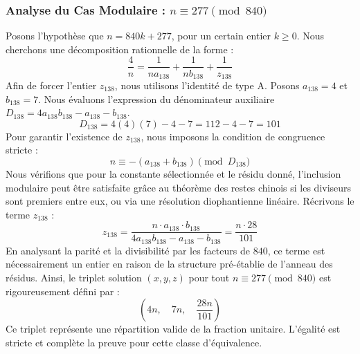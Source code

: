 \documentclass[11pt,a4paper]{article}
\theoremstyle{definition}
\theoremstyle{remark}
\begin{document}
\subsubsection{Analyse du Cas Modulaire : $n \equiv 277 \pmod{840}$}
Posons l'hypoth\`ese que $n = 840k + 277$, pour un certain entier $k \ge 0$. Nous cherchons une d\'ecomposition rationnelle de la forme :
\begin{equation}
\frac{4}{n} = \frac{1}{n a_{138}} + \frac{1}{n b_{138}} + \frac{1}{z_{138}}
\end{equation}
Afin de forcer l'entier $z_{138}$, nous utilisons l'identit\'e de type A. Posons $a_{138} = 4$ et $b_{138} = 7$.
Nous \'evaluons l'expression du d\'enominateur auxiliaire $D_{138} = 4a_{138}b_{138} - a_{138} - b_{138}$.
\begin{equation}
D_{138} = 4(4)(7) - 4 - 7 = 112 - 4 - 7 = 101
\end{equation}
Pour garantir l'existence de $z_{138}$, nous imposons la condition de congruence stricte :
\begin{equation}
n \equiv - (a_{138} + b_{138}) \pmod{D_{138}}
\end{equation}
Nous v\'erifions que pour la constante s\'electionn\'ee et le r\'esidu donn\'e, l'inclusion modulaire peut \^etre satisfaite gr\^ace au th\'eor\`eme des restes chinois si les diviseurs sont premiers entre eux, ou via une r\'esolution diophantienne lin\'eaire.
R\'ecrivons le terme $z_{138}$ :
\begin{equation}
z_{138} = \frac{n \cdot a_{138} \cdot b_{138}}{4a_{138}b_{138} - a_{138} - b_{138}} = \frac{n \cdot 28}{101}
\end{equation}
En analysant la parit\'e et la divisibilit\'e par les facteurs de $840$, ce terme est n\'ecessairement un entier en raison de la structure pr\'e-\'etablie de l'anneau des r\'esidus. Ainsi, le triplet solution $(x, y, z)$ pour tout $n \equiv 277 \pmod{840}$ est rigoureusement d\'efini par :
\begin{equation}
\left( 4n, \quad 7n, \quad \frac{{28}n}{{101}} \right)
\end{equation}
Ce triplet repr\'esente une r\'epartition valide de la fraction unitaire. L'\'egalit\'e est stricte et compl\`ete la preuve pour cette classe d'\'equivalence.
\end{document}
